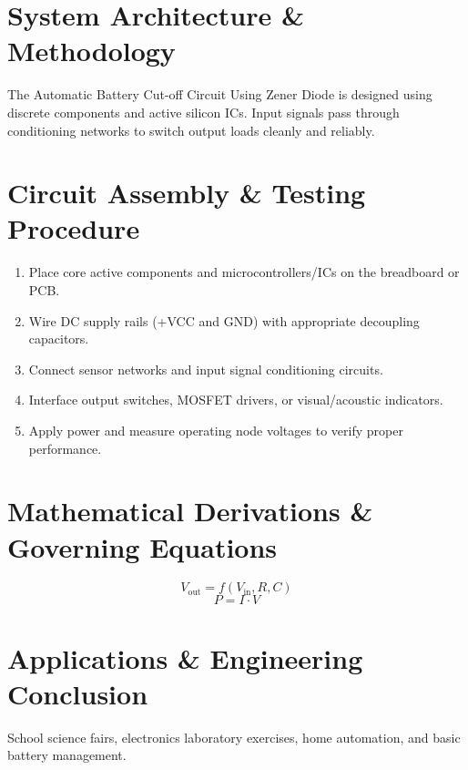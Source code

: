 \documentclass[11pt,a4paper]{article}
\begin{document}
\section{System Architecture \& Methodology}
The Automatic Battery Cut-off Circuit Using Zener Diode is designed using discrete components and active silicon ICs. Input signals pass through conditioning networks to switch output loads cleanly and reliably.

\section{Circuit Assembly \& Testing Procedure}
\begin{enumerate}
    \item Place core active components and microcontrollers/ICs on the breadboard or PCB.
    \item Wire DC supply rails (+VCC and GND) with appropriate decoupling capacitors.
    \item Connect sensor networks and input signal conditioning circuits.
    \item Interface output switches, MOSFET drivers, or visual/acoustic indicators.
    \item Apply power and measure operating node voltages to verify proper performance.
\end{enumerate}

\section{Mathematical Derivations \& Governing Equations}
\begin{equation}
V_{\text{out}} = f(V_{\text{in}}, R, C)
\end{equation}
\begin{equation}
P = I \cdot V
\end{equation}

\section{Applications \& Engineering Conclusion}
School science fairs, electronics laboratory exercises, home automation, and basic battery management.
\end{document}
